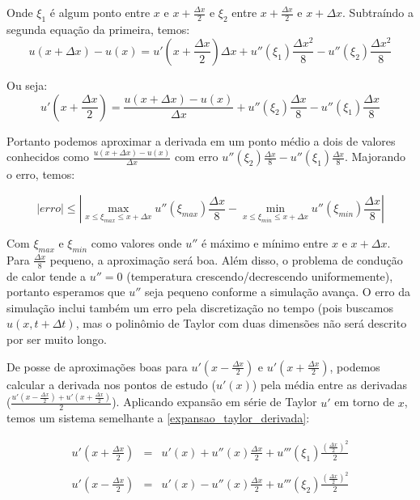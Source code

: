 \documentclass[12pt,fleqn]{article}
\begin{document}
Onde $\xi_1$ é algum ponto entre $x$ e $x + \frac{\Delta x}{2}$ e $\xi_2$ entre $x + \frac{\Delta x}{2}$ e $x + \Delta x$. Subtraíndo a segunda equação da primeira, temos:
\[u(x + \Delta x) - u(x) = u'(x + \frac{\Delta x}{2}) \Delta x + u''(\xi_1) \frac{\Delta x ^ 2}{8} - u''(\xi_2) \frac{\Delta x ^ 2}{8}\]

Ou seja:
\[u'(x + \frac{\Delta x}{2}) = \frac{u(x + \Delta x) - u(x)}{\Delta x} + u''(\xi_2) \frac{\Delta x}{8} - u''(\xi_1) \frac{\Delta x}{8}\]

Portanto podemos aproximar a derivada em um ponto médio a dois de valores conhecidos como $\frac{u(x + \Delta x) - u(x)}{\Delta x}$ com erro $u''(\xi_2) \frac{\Delta x}{8} - u''(\xi_1) \frac{\Delta x}{8}$. Majorando o erro, temos:

\[|erro| \leq |\max_{x \leq \xi_{max} \leq x + \Delta x} u''(\xi_{max}) \frac{\Delta x}{8} - \min_{x \leq \xi_{min} \leq x + \Delta x} u''(\xi_{min}) \frac{\Delta x}{8}|\]

Com $\xi_{max}$ e $\xi_{min}$ como valores onde $u''$ é máximo e mínimo entre $x$ e $x + \Delta x$. Para $\frac{\Delta x}{8}$ pequeno, a aproximação será boa. Além disso, o problema de condução de calor tende a $u'' = 0$ (temperatura crescendo/decrescendo uniformemente), portanto esperamos que $u''$ seja pequeno conforme a simulação avança. O erro da simulação inclui também um erro pela discretização no tempo (pois buscamos $u(x, t + \Delta t)$, mas o polinômio de Taylor com duas dimensões não será descrito por ser muito longo.

De posse de aproximações boas para $u'(x - \frac{\Delta x}{2})$ e $u'(x + \frac{\Delta x}{2})$, podemos calcular a derivada nos pontos de estudo ($u'(x)$) pela média entre as derivadas ($\frac{u'(x - \frac{\Delta x}{2}) + u'(x + \frac{\Delta x}{2})}{2}$). Aplicando expansão em série de Taylor $u'$ em torno de $x$, temos um sistema semelhante a \ref{expansao_taylor_derivada}:

\begin{equation}
\label{expansao_taylor_derivada_central}
\begin{array}{rcl}
	u'(x + \frac{\Delta x}{2}) & = & u'(x) + u''(x) \frac{\Delta x}{2} + u'''(\xi_1) \frac{(\frac{\Delta x}{2}) ^ 2}{2} \\ \\
	u'(x - \frac{\Delta x}{2}) & = & u'(x) - u''(x) \frac{\Delta x}{2} + u'''(\xi_2) \frac{(\frac{\Delta x}{2}) ^ 2}{2}
\end{array}
\end{equation}
\end{document}
